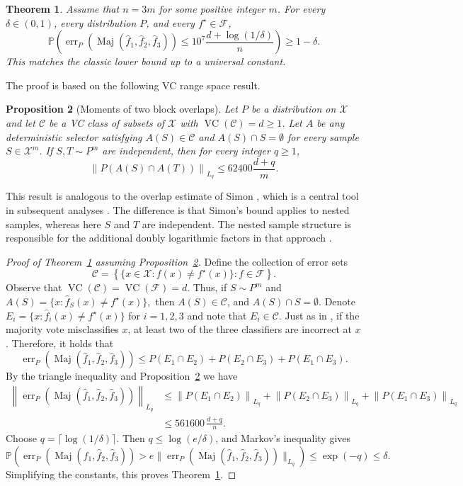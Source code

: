 \documentclass[10pt,a4paper]{amsart}
\newcommand{\X}{\mathcal X}
\newcommand{\F}{\mathcal F}
\newcommand{\C}{\mathcal C}
\newcommand{\Prb}{\mathbb P}
\newcommand{\1}{\mathbf 1}
\newcommand{\err}{\operatorname{err}}
\newcommand{\Maj}{\operatorname{Maj}}
\newcommand{\vc}{\operatorname{VC}}
\newtheorem{theorem}{Theorem}[section]
\newtheorem{proposition}[theorem]{Proposition}
\begin{document}
\begin{theorem}\label{thm:main}
Assume that $n = 3m$ for some positive integer $m$. For every $\delta\in(0,1)$, every distribution $P$, and every $f^\star \in \F$,
\[
\Prb\left(\err_P\left(\Maj(\widehat f_1,\widehat f_2,\widehat f_3)\right)
\le 10^7\frac{d+\log(1/\delta)}{n}\right)\ge 1-\delta .
\]
This matches the classic lower bound \cite{ehrenfeucht1989general} up to a universal constant. 
\end{theorem}


The proof is based on the following VC range space result.
\begin{proposition}[Moments of two block overlaps]
\label{prop:moment}
Let $P$ be a distribution on $\X$ and let $\C$ be a VC class of subsets of $\X$ with $\vc(\C)=d\ge1$.  Let $A$ be any deterministic selector satisfying $A(S)\in\C$ and $A(S)\cap S=\emptyset$ for every sample $S\in\X^m$.  If $S,T\sim P^m$ are independent, then for every integer $q\ge 1$,
\[
\left\|P(A(S)\cap A(T))\right\|_{L_q}
\le 62400\frac{d+q}{m}.
\]
\end{proposition}
This result is analogous to the overlap estimate of Simon \cite{Simon2015}, which is a central tool in subsequent analyses
\cite{Hanneke2016,Larsen2023Bagging,AdenAliHogsgaardLarsenZhivotovskiy2024}. The difference is that Simon's bound applies to nested samples, whereas here
$S$ and $T$ are independent. The nested sample structure is responsible for the additional doubly logarithmic factors in that approach \cite{AdenAliHogsgaardLarsenZhivotovskiy2024}.


\begin{proof}[Proof of Theorem~\ref{thm:main} assuming Proposition~\ref{prop:moment}]
Define the collection of error sets
\[
\C=\left\{\{x\in\X:f(x)\ne f^\star(x)\}: f\in\F \right\}.
\]
Observe that $\vc(\C)=\vc(\F)=d$. Thus,  if $S\sim P^m$ and
$
A(S)=\{x:\widehat f_S(x)\ne f^\star(x)\},
$
then $ A(S)\in\C$,
and $A(S)\cap S=\emptyset$. Denote  $E_i=\{x:\widehat f_i(x)\ne f^\star(x)\}$ for $i= 1,2,3$ and note that $E_i \in \C$. Just as in \cite{Simon2015}, if the majority vote misclassifies $x$, at least two of the three classifiers are incorrect at $x$. Therefore, it holds that
\[
\err_P\left(\Maj(\widehat f_1,\widehat f_2,\widehat f_3)\right)
\le  P(E_1\cap E_2) + P(E_2\cap E_3) + P(E_1\cap E_3) .
\]
By the triangle inequality and Proposition~\ref{prop:moment} we have
\begin{align*}
\left\|\err_P\left(\Maj(\widehat f_1,\widehat f_2,\widehat f_3)\right)\right\|_{L_q} &\le \left\|P(E_1\cap E_2)\right\|_{L_q}  + \left\|P(E_2\cap E_3)\right\|_{L_q}  + \left\|P(E_1\cap E_3)\right\|_{L_q} 
\\
&\le 561600\,\frac{d+q}{n}.
\end{align*}
Choose $q=\lceil \log(1/\delta)\rceil$.  Then $q\le \log(e/\delta)$, and Markov's inequality gives 
\[
\Prb\left(\err_P\left(\Maj(\widehat f_1,\widehat f_2,\widehat f_3)\right)>e\|\err_P\left(\Maj(\widehat f_1,\widehat f_2,\widehat f_3)\right)\|_{L_q}\right)\le \exp(-q)\le\delta.
\]
Simplifying the constants, this proves Theorem~\ref{thm:main}.
\end{proof}
\end{document}
